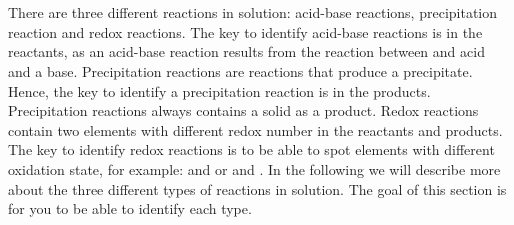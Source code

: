 \documentclass[main.tex]{subfiles} %
\begin{document}
\section{\color{blue!30!black}{An introduction to reactions in solution}}
There are three different reactions in solution: acid-base reactions, precipitation reaction and redox reactions. The key to identify acid-base reactions is in the reactants, as an acid-base reaction results from the reaction between and acid and a base. Precipitation reactions are reactions that produce a precipitate. Hence, the key to identify a precipitation reaction is in the products. Precipitation reactions always contains a solid as a product. Redox reactions contain two elements with different redox number in the reactants and products. The key to identify redox reactions is to be able to spot elements with different oxidation state, for example:  and  or  and . In the following we will describe more about the three different types of reactions in solution. The goal of this section is for you to be able to identify each type.
\sloppy 
\end{document}
